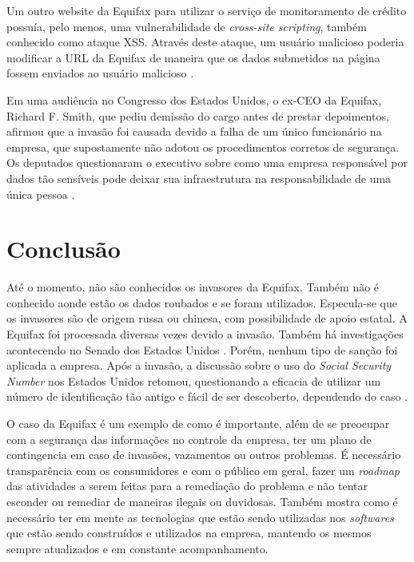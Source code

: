 \documentclass[conference]{IEEEtran}
\begin{document}
Um outro website da Equifax para utilizar o serviço de monitoramento de crédito possuía, pelo menos, uma vulnerabilidade de \textit{cross-site scripting}, também conhecido como ataque XSS. Através deste ataque, um
usuário malicioso poderia modificar a URL da Equifax de maneira que os dados submetidos na página fossem enviados ao usuário malicioso \cite{Whittaker2017}.

Em uma audiência no Congresso dos Estados Unidos, o ex-CEO da Equifax, Richard F. Smith, que pediu demissão do cargo antes de prestar depoimentos, afirmou que a invasão foi causada devido a falha de um único funcionário na empresa, que
supostamente não adotou os procedimentos corretos de segurança. Os deputados questionaram o executivo sobre como uma empresa responsável por dados tão sensíveis pode deixar sua infraestrutura na responsabilidade de uma
única pessoa \cite{Cowley2017}.

\section{Conclusão}
Até o momento, não são conhecidos os invasores da Equifax. Também não é conhecido aonde estão os dados roubados e se foram utilizados. Especula-se que os invasores são de origem russa ou chinesa, com possibilidade de apoio estatal.
A Equifax foi processada diversas vezes devido a invasão. Também há investigações acontecendo no Senado dos Estados Unidos \cite{Schroeder2018} \cite{Darrow2017} \cite{Dungan2018}. Porém, nenhum tipo de sanção foi aplicada a empresa. Após a invasão, a discussão sobre o uso do 
\textit{Social Security Number} nos Estados Unidos retomou, questionando a eficacia de utilizar um número de identificação tão antigo e fácil de ser descoberto, dependendo do caso \cite{Syeed2017}.

O caso da Equifax é um exemplo de como é importante, além de se preocupar com a segurança das informações no controle da empresa, ter um plano de contingencia em caso de invasões, vazamentos ou outros problemas. É necessário transparência com os consumidores e com o público em geral,
fazer um \textit{roadmap} das atividades a serem feitas para a remediação do problema e não tentar esconder ou remediar de maneiras ilegais ou duvidosas. Também mostra como é necessário ter em mente as tecnologias que estão sendo utilizadas nos \textit{softwares} que estão sendo 
construídos e utilizados na empresa, mantendo os mesmos sempre atualizados e em constante acompanhamento.



\end{document}
